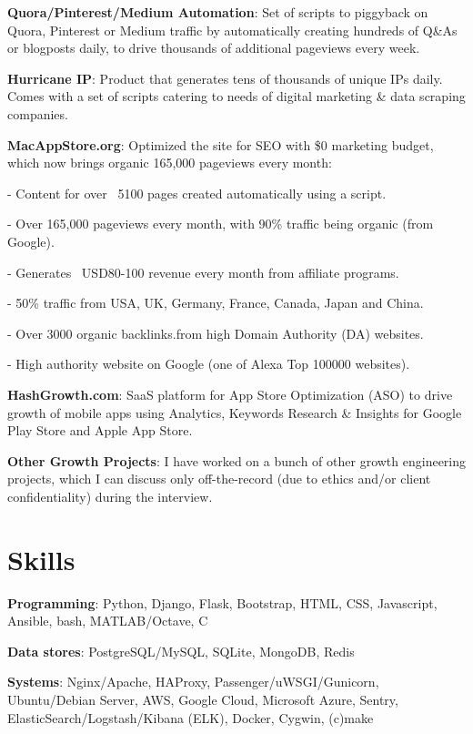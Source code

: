 \documentclass[overlapped,centered]{resume}
\begin{document}
\begin{resume}
\begin{list2}
	\item \textbf{Quora/Pinterest/Medium Automation}: Set of scripts to piggyback on Quora, Pinterest or Medium traffic by automatically creating hundreds of Q\&As or blogposts daily, to drive thousands of additional pageviews every week.
	
	\item \textbf{Hurricane IP}: Product that generates tens of thousands of unique IPs daily. Comes with a set of scripts catering to needs of digital marketing \& data scraping companies.
	
	\item \textbf{MacAppStore.org}: Optimized the site for SEO with \$0 marketing budget, which now brings organic 165,000 pageviews every month:

	\setlength{\leftskip}{15pt}
	
		- Content for over ~5100 pages created automatically using a script. 
	
		- Over 165,000 pageviews every month, with 90\% traffic being organic (from Google).
		
		- Generates ~USD80-100 revenue every month from affiliate programs.
	
		- 50\% traffic from USA, UK, Germany, France, Canada, Japan and China.
	
		- Over 3000 organic backlinks.from high Domain Authority (DA) websites.
	
		- High authority website on Google (one of Alexa Top 100000 websites).
	
	\setlength{\leftskip}{0pt}
	
	\item \textbf{HashGrowth.com}: SaaS platform for App Store Optimization (ASO) to drive growth of mobile apps using Analytics, Keywords Research \& Insights for Google Play Store and Apple App Store.
	
	\item \textbf{Other Growth Projects}: I have worked on a bunch of other growth engineering projects, which I can discuss only off-the-record (due to ethics and/or client confidentiality) during the interview.
	
	\end{list2}
	
    \section{\mysidestyle Skills} 

    \begin{list2}
	\item \textbf{Programming}: Python, Django, Flask, Bootstrap, HTML, CSS, Javascript, Ansible, bash, MATLAB/Octave, C
	\item \textbf{Data stores}: PostgreSQL/MySQL, SQLite,	MongoDB, Redis
	\item \textbf{Systems}: Nginx/Apache, HAProxy, Passenger/uWSGI/Gunicorn, Ubuntu/Debian Server, AWS, Google Cloud, Microsoft Azure, Sentry, ElasticSearch/Logstash/Kibana (ELK), Docker, Cygwin, (c)make
	\end{list2}


\end{resume}
\end{document}

